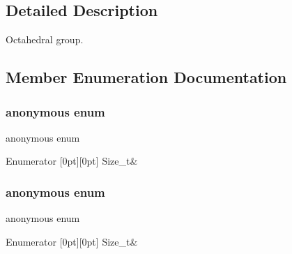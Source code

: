 \subsection{Detailed Description}
Octahedral group. 

\subsection{Member Enumeration Documentation}
\mbox{\label{structHadron_1_1OctGroup_a545f26a6b3e87fcbd91a5f2557e79b1f}} 
\subsubsection{\texorpdfstring{anonymous enum}{anonymous enum}}
{\footnotesize\ttfamily anonymous enum}

\begin{DoxyEnumFields}{Enumerator}
[0pt][0pt]{}\mbox{\label{structHadron_1_1OctGroup_a545f26a6b3e87fcbd91a5f2557e79b1fa6b4fe14565af7dd82a9b9bfa022cfbc6}} 
Size\+\_\+t&\\
\hline

\end{DoxyEnumFields}
\mbox{\label{structHadron_1_1OctGroup_ae2744c15214249a2f6c63f72477f2675}} 
\subsubsection{\texorpdfstring{anonymous enum}{anonymous enum}}
{\footnotesize\ttfamily anonymous enum}

\begin{DoxyEnumFields}{Enumerator}
[0pt][0pt]{}\mbox{\label{structHadron_1_1OctGroup_a545f26a6b3e87fcbd91a5f2557e79b1fa6b4fe14565af7dd82a9b9bfa022cfbc6}} 
Size\+\_\+t&\\
\hline

\end{DoxyEnumFields}


